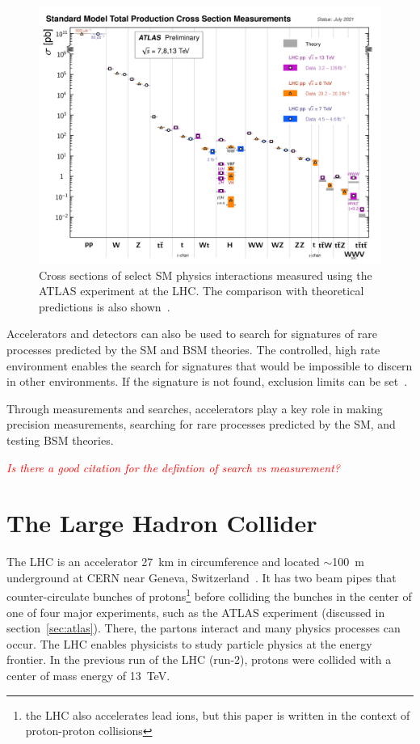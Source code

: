 \begin{figure}
    \centering
    \includegraphics[width = \textwidth]{figures/atlas_cross_sections.png}
    \caption{Cross sections of select SM physics interactions measured using the ATLAS experiment at the LHC. The comparison with theoretical predictions is also shown~\cite{atlas_public_web_sm}.}
    \label{fig:atlas_cross_sections}
\end{figure}

Accelerators and detectors can also be used to search for signatures of rare processes predicted by the SM and BSM theories. The controlled, high rate environment enables the search for signatures that would be impossible to discern in other environments. If the signature is not found, exclusion limits can be set~\cite{lista_statistical_2017}.

Through measurements and searches, accelerators play a key role in making precision measurements, searching for rare processes predicted by the SM, and testing BSM theories.

\textcolor{red}{\textit{Is there a good citation for the defintion of search vs measurement?}}

\section{The Large Hadron Collider}

The LHC is an accelerator \SI{27}{\kilo\meter} in circumference and located $\sim$\SI{100}{\meter} underground at CERN near Geneva, Switzerland~\cite{evans_lhc_2008}. It has two beam pipes that counter-circulate bunches of protons\footnote{the LHC also accelerates lead ions, but this paper is written in the context of proton-proton collisions} before colliding the bunches in the center of one of four major experiments, such as the ATLAS experiment (discussed in section~\ref{sec:atlas}). There, the partons interact and many physics processes can occur. The LHC enables physicists to study particle physics at the energy frontier. In the previous run of the LHC (run-2), protons were collided with a center of mass energy of \SI{13}{\tera\electronvolt}. 

